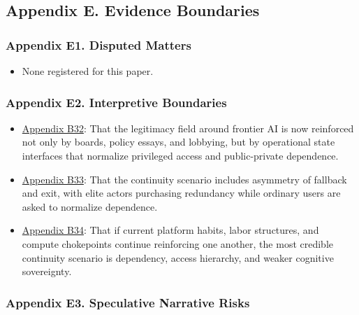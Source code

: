 \documentclass[
  american,
  11pt,
  letterpaper,
]{article}
\providecommand{\tightlist}{%
  \setlength{\itemsep}{0pt}\setlength{\parskip}{0pt}}
\begin{document}
\subsection{Appendix E. Evidence
Boundaries}\label{appendix-e.-evidence-boundaries-9}

\subsubsection{Appendix E1. Disputed
Matters}\label{ch-09-appendix-e1-disputed-matters}

\begin{itemize}
\tightlist
\item
  None registered for this paper.
\end{itemize}

\subsubsection{Appendix E2. Interpretive
Boundaries}\label{ch-09-appendix-e2-interpretive-boundaries}

\begin{itemize}
\tightlist
\item
  \hyperref[ch-09-appendix-b32-the-legitimacy-field-around-frontier-ai-is-now-reinforced-not-only-by-boards-pol]{Appendix
  B32}: That the legitimacy field around frontier AI is now reinforced
  not only by boards, policy essays, and lobbying, but by operational
  state interfaces that normalize privileged access and public-private
  dependence.
\item
  \hyperref[ch-09-appendix-b33-the-continuity-scenario-includes-asymmetry-of-fallback-and-exit-with-elite-actor]{Appendix
  B33}: That the continuity scenario includes asymmetry of fallback and
  exit, with elite actors purchasing redundancy while ordinary users are
  asked to normalize dependence.
\item
  \hyperref[ch-09-appendix-b34-if-current-platform-habits-labor-structures-and-compute-chokepoints-continue-re]{Appendix
  B34}: That if current platform habits, labor structures, and compute
  chokepoints continue reinforcing one another, the most credible
  continuity scenario is dependency, access hierarchy, and weaker
  cognitive sovereignty.
\end{itemize}

\subsubsection{Appendix E3. Speculative Narrative
Risks}\label{ch-09-appendix-e3-speculative-narrative-risks}
\end{document}
